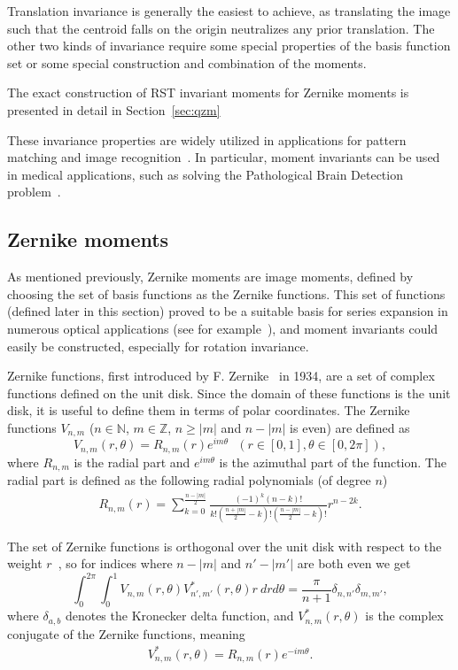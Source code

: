 Translation invariance is generally the easiest to achieve, as translating the image such that the centroid falls on the origin neutralizes any prior translation. The other two kinds of invariance require some special properties of the basis function set or some special construction and combination of the moments.


The exact construction of RST invariant moments for Zernike moments is presented in detail in Section~\ref{sec:qzm}


These invariance properties are widely utilized in applications for pattern matching and image recognition~\cite{app1, app2, app3}. In particular, moment invariants can be used in medical applications, such as solving the Pathological Brain Detection problem~\cite{med_app_1}.


\subsection{Zernike moments}
As mentioned previously, Zernike moments are image moments, defined by choosing the set of basis functions as the Zernike functions. This set of functions (defined later in this section) proved to be a suitable basis for series expansion in numerous optical applications (see for example~\cite{wavefront,optical_human_eye,opt_surf}), and moment invariants could easily be constructed, especially for rotation invariance.


Zernike functions, first introduced by F. Zernike~\cite{zernike} in 1934, are a set of complex functions defined on the unit disk. Since the domain of these functions is the unit disk, it is useful to define them in terms of polar coordinates. The Zernike functions $V_{n,m}$ ($n \in \mathds{N}$, $m \in \mathds{Z}$, $n \geq |m|$ and $n - |m|$ is even) are defined as
\begin{equation}\label{ZernikeFunction}
  V_{n,m}(r,\theta) = R_{n,m}(r) e^{i m\theta} \ \ \ (r\in[0,1], \theta\in[0,2\pi]),
\end{equation}
where $R_{n,m}$ is the radial part and $e^{i m\theta}$ is the azimuthal part of the function. The radial part is defined as the following radial polynomials (of degree $n$)
\begin{gather}
    R_{n,m}(r) = \sum_{k=0}^{\frac{n - |m|}{2}}\frac{(-1)^k (n - k)!}{k!\left(\frac{n + |m|}{2} - k\right)!\left(\frac{n - |m|}{2} - k\right)!}r^{n-2k} \label{eq:radial_poly}.
\end{gather} 


The set of Zernike functions is orthogonal over the unit disk with respect to the weight $r$~\cite{zernike_moments}, so for indices where $n - |m|$ and $n' - |m'|$ are both even we get
\begin{equation}\label{Zortho}
	\int_0^{2\pi}\int_0^1 V_{n,m}(r,\theta)V_{n',m'}^*(r,\theta)r\ dr d\theta  = \frac{\pi}{n + 1}\delta_{n,n'}\delta_{m,m'},
\end{equation}
where $\delta_{a,b}$ denotes the Kronecker delta function, and $V_{n,m}^{*}(r,\theta)$ is the complex conjugate of the Zernike functions, meaning
\begin{gather*}
    V_{n,m}^{*}(r,\theta) = R_{n,m}(r) e^{-i m\theta}.
\end{gather*}

